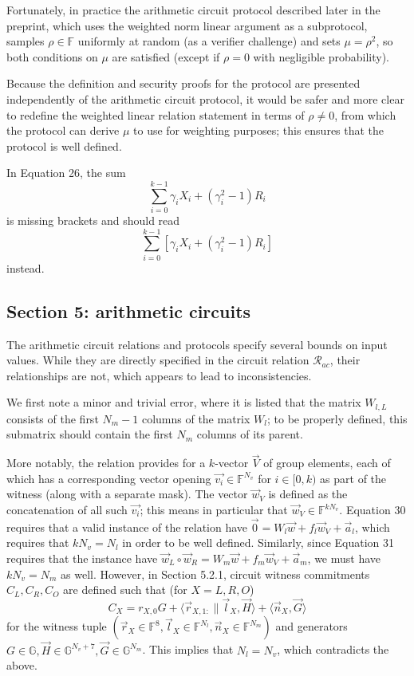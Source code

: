 \documentclass{article}
\begin{document}
Fortunately, in practice the arithmetic circuit protocol described later in the preprint, which uses the weighted norm linear argument as a subprotocol, samples $\rho \in \mathbb{F}$ uniformly at random (as a verifier challenge) and sets $\mu = \rho^2$, so both conditions on $\mu$ are satisfied (except if $\rho = 0$ with negligible probability).

Because the definition and security proofs for the protocol are presented independently of the arithmetic circuit protocol, it would be safer and more clear to redefine the weighted linear relation statement in terms of $\rho \neq 0$, from which the protocol can derive $\mu$ to use for weighting purposes; this ensures that the protocol is well defined.

In Equation 26, the sum
$$\sum_{i=0}^{k-1} \gamma_i X_i + (\gamma_i^2 - 1) R_i$$
is missing brackets and should read
$$\sum_{i=0}^{k-1} \left[ \gamma_i X_i + (\gamma_i^2 - 1) R_i \right]$$
instead.


\subsection{Section 5: arithmetic circuits}

The arithmetic circuit relations and protocols specify several bounds on input values.
While they are directly specified in the circuit relation $\mathcal{R}_{ac}$, their relationships are not, which appears to lead to inconsistencies.

We first note a minor and trivial error, where it is listed that the matrix $W_{l,L}$ consists of the first $N_m - 1$ columns of the matrix $W_l$; to be properly defined, this submatrix should contain the first $N_m$ columns of its parent.

More notably, the relation provides for a $k$-vector $\vec{V}$ of group elements, each of which has a corresponding vector opening $\vec{v_i} \in \mathbb{F}^{N_v}$ for $i \in [0, k)$ as part of the witness (along with a separate mask).
The vector $\vec{w}_V$ is defined as the concatenation of all such $\vec{v_i}$; this means in particular that $\vec{w}_V \in \mathbb{F}^{k N_v}$.
Equation 30 requires that a valid instance of the relation have $\vec{0} = W_l \vec{w} + f_l \vec{w}_V + \vec{a}_l$, which requires that $k N_v = N_l$ in order to be well defined.
Similarly, since Equation 31 requires that the instance have $\vec{w}_L \circ \vec{w}_R = W_m \vec{w} + f_m \vec{w}_V + \vec{a}_m$, we must have $k N_v = N_m$ as well.
However, in Section 5.2.1, circuit witness commitments $C_L, C_R, C_O$ are defined such that (for $X = L, R, O$)
$$C_X = r_{X,0} G + \langle \vec{r}_{X,1:} \| \vec{l}_X, \vec{H} \rangle + \langle \vec{n}_X, \vec{G} \rangle$$
for the witness tuple $(\vec{r}_X \in \mathbb{F}^8, \vec{l}_X \in \mathbb{F}^{N_l}, \vec{n}_X \in \mathbb{F}^{N_m})$ and generators $G \in \mathbb{G}, \vec{H} \in \mathbb{G}^{N_v + 7}, \vec{G} \in \mathbb{G}^{N_m}$.
This implies that $N_l = N_v$, which contradicts the above.
\end{document}
